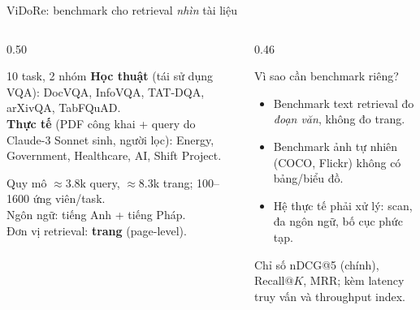 \documentclass[aspectratio=169,10pt]{beamer}
\begin{document}
\begin{frame}{ViDoRe: benchmark cho retrieval \emph{nhìn} tài liệu}
  \begin{columns}[T]
    \begin{column}{0.50\textwidth}
      \begin{block}{\small 10 task, 2 nhóm}
        \footnotesize
        \textbf{Học thuật} (tái sử dụng VQA): DocVQA, InfoVQA, TAT-DQA, arXivQA, TabFQuAD.\\
        \textbf{Thực tế} (PDF công khai + query do Claude-3 Sonnet sinh, người lọc): Energy, Government, Healthcare, AI, Shift Project.
      \end{block}
      \begin{block}{\small Quy mô}
        \footnotesize
        $\approx$3.8k query, $\approx$8.3k trang; 100--1600 ứng viên/task.\\
        Ngôn ngữ: tiếng Anh + tiếng Pháp.\\
        Đơn vị retrieval: \textbf{trang} (page-level).
      \end{block}
    \end{column}
    \begin{column}{0.46\textwidth}
      \begin{block}{\small Vì sao cần benchmark riêng?}
        \footnotesize
        \begin{itemize}
          \item Benchmark text retrieval đo \emph{đoạn văn}, không đo trang.
          \item Benchmark ảnh tự nhiên (COCO, Flickr) không có bảng/biểu đồ.
          \item Hệ thực tế phải xử lý: scan, đa ngôn ngữ, bố cục phức tạp.
        \end{itemize}
      \end{block}
      \begin{block}{\small Chỉ số}
        \footnotesize
        nDCG@5 (chính), Recall@$K$, MRR; kèm latency truy vấn và throughput index.
      \end{block}
    \end{column}
  \end{columns}
\end{frame}
\end{document}
